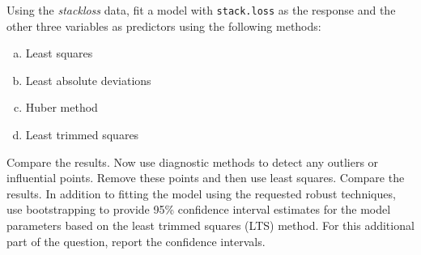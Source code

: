 \documentclass{homework}
\begin{document}
\begin{longproblem}
  Using the \emph{stackloss} data, fit a model with \texttt{stack.loss} as the
  response and the other three variables as predictors using the following
  methods:
  \begin{enumerate}[(a)]
    \item Least squares
    \item Least absolute deviations
    \item Huber method
    \item Least trimmed squares
  \end{enumerate}
  Compare the results.  Now use diagnostic methods to detect any outliers or
  influential points.  Remove these points and then use least squares.  Compare
  the results.  In addition to fitting the model using the requested robust
  techniques, use bootstrapping to provide 95\% confidence interval estimates
  for the model parameters based on the least trimmed squares (LTS) method.
    For this additional part of the question, report the confidence intervals.
\end{longproblem}
\end{document}
